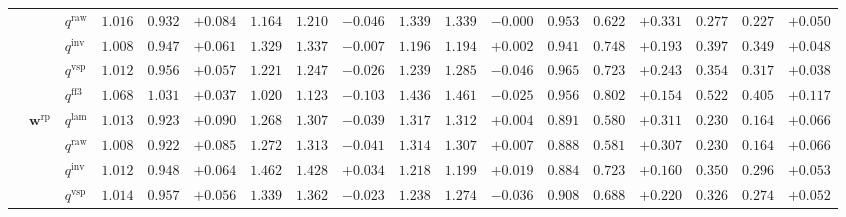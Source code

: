 \documentclass{article}
\begin{document}
\begin{table}[!htbp]
{\begin{tabular}{lll ccc ccc ccc ccc ccc}
 &  & $q^{\mathrm{raw}}$ & $1.016$ & $0.932$ & \cellcolor{posgreen!50}$+0.084$ & $1.164$ & $1.210$ & \cellcolor{negred!50}$-0.046$ & $1.339$ & $1.339$ & $-0.000$ & $0.953$ & $0.622$ & \cellcolor{posgreen!50}$+0.331$ & $0.277$ & $0.227$ & \cellcolor{posgreen!50}$+0.050$ \\
 &  & $q^{\mathrm{inv}}$ & $1.008$ & $0.947$ & \cellcolor{posgreen!50}$+0.061$ & $1.329$ & $1.337$ & \cellcolor{negred!50}$-0.007$ & $1.196$ & $1.194$ & \cellcolor{posgreen!50}$+0.002$ & $0.941$ & $0.748$ & \cellcolor{posgreen!50}$+0.193$ & $0.397$ & $0.349$ & \cellcolor{posgreen!50}$+0.048$ \\
 &  & $q^{\mathrm{vsp}}$ & $1.012$ & $0.956$ & \cellcolor{posgreen!50}$+0.057$ & $1.221$ & $1.247$ & \cellcolor{negred!50}$-0.026$ & $1.239$ & $1.285$ & \cellcolor{negred!50}$-0.046$ & $0.965$ & $0.723$ & \cellcolor{posgreen!50}$+0.243$ & $0.354$ & $0.317$ & \cellcolor{posgreen!50}$+0.038$ \\
 &  & $q^{\mathrm{ff3}}$ & $1.068$ & $1.031$ & \cellcolor{posgreen!50}$+0.037$ & $1.020$ & $1.123$ & \cellcolor{negred!50}$-0.103$ & $1.436$ & $1.461$ & \cellcolor{negred!50}$-0.025$ & $0.956$ & $0.802$ & \cellcolor{posgreen!50}$+0.154$ & $0.522$ & $0.405$ & \cellcolor{posgreen!50}$+0.117$ \\
\cmidrule(lr){2-18}
 & $\mathbf{w}^{\mathrm{rp}}$ & $q^{\mathrm{lam}}$ & $1.013$ & $0.923$ & \cellcolor{posgreen!50}$+0.090$ & $1.268$ & $1.307$ & \cellcolor{negred!50}$-0.039$ & $1.317$ & $1.312$ & \cellcolor{posgreen!50}$+0.004$ & $0.891$ & $0.580$ & \cellcolor{posgreen!50}$+0.311$ & $0.230$ & $0.164$ & \cellcolor{posgreen!50}$+0.066$ \\
 &  & $q^{\mathrm{raw}}$ & $1.008$ & $0.922$ & \cellcolor{posgreen!50}$+0.085$ & $1.272$ & $1.313$ & \cellcolor{negred!50}$-0.041$ & $1.314$ & $1.307$ & \cellcolor{posgreen!50}$+0.007$ & $0.888$ & $0.581$ & \cellcolor{posgreen!50}$+0.307$ & $0.230$ & $0.164$ & \cellcolor{posgreen!50}$+0.066$ \\
 &  & $q^{\mathrm{inv}}$ & $1.012$ & $0.948$ & \cellcolor{posgreen!50}$+0.064$ & $1.462$ & $1.428$ & \cellcolor{posgreen!50}$+0.034$ & $1.218$ & $1.199$ & \cellcolor{posgreen!50}$+0.019$ & $0.884$ & $0.723$ & \cellcolor{posgreen!50}$+0.160$ & $0.350$ & $0.296$ & \cellcolor{posgreen!50}$+0.053$ \\
 &  & $q^{\mathrm{vsp}}$ & $1.014$ & $0.957$ & \cellcolor{posgreen!50}$+0.056$ & $1.339$ & $1.362$ & \cellcolor{negred!50}$-0.023$ & $1.238$ & $1.274$ & \cellcolor{negred!50}$-0.036$ & $0.908$ & $0.688$ & \cellcolor{posgreen!50}$+0.220$ & $0.326$ & $0.274$ & \cellcolor{posgreen!50}$+0.052$ \\

\end{tabular}}
\end{table}
\end{document}
